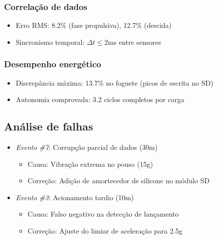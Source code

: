 \subsubsection{Correlação de dados}
\begin{itemize}
    \item Erro RMS: 8.2\% (fase propulsiva), 12.7\% (descida)
    \item Sincronismo temporal: $\Delta t \leq 2$ms entre sensores
\end{itemize}

\subsubsection{Desempenho energético}
\begin{itemize}
    \item Discrepância máxima: 13.7\% no foguete (picos de escrita no SD)
    \item Autonomia comprovada: 3.2 ciclos completos por carga
\end{itemize}

\subsection{Análise de falhas}
\begin{itemize}
    \item \textit{Evento \#7}: Corrupção parcial de dados (30m)
    \begin{itemize}
        \item Causa: Vibração extrema no pouso (15g)
        \item Correção: Adição de amortecedor de silicone no módulo SD
    \end{itemize}
    \item \textit{Evento \#3}: Acionamento tardio (10m)
    \begin{itemize}
        \item Causa: Falso negativo na detecção de lançamento
        \item Correção: Ajuste do limiar de aceleração para 2.5g
    \end{itemize}
\end{itemize}

